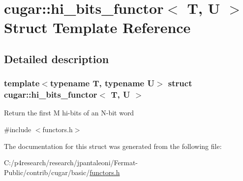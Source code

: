\hypertarget{structcugar_1_1hi__bits__functor}{}\section{cugar\+:\+:hi\+\_\+bits\+\_\+functor$<$ T, U $>$ Struct Template Reference}
\label{structcugar_1_1hi__bits__functor}


\subsection{Detailed description}
\subsubsection*{template$<$typename T, typename U$>$\newline
struct cugar\+::hi\+\_\+bits\+\_\+functor$<$ T, U $>$}

Return the first M hi-\/bits of an N-\/bit word 

{\ttfamily \#include $<$functors.\+h$>$}



The documentation for this struct was generated from the following file\+:\begin{DoxyCompactItemize}
\item 
C\+:/p4research/research/jpantaleoni/\+Fermat-\/\+Public/contrib/cugar/basic/\hyperlink{functors_8h}{functors.\+h}\end{DoxyCompactItemize}
